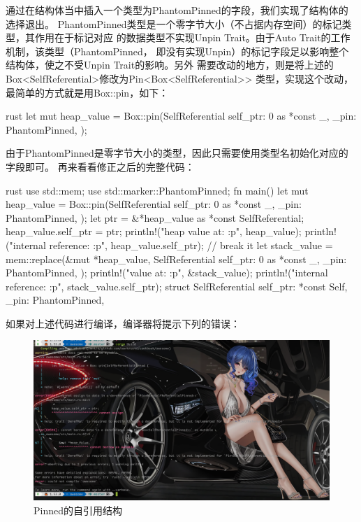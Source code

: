 通过在结构体当中插入一个类型为PhantomPinned的字段，我们实现了结构体的选择退出。
PhantomPinned类型是一个零字节大小（不占据内存空间）的标记类型，其作用在于标记对应
的数据类型不实现Unpin Trait。由于Auto Trait的工作机制，该类型（PhantomPinned，
即没有实现Unpin）的标记字段足以影响整个结构体，使之不受Unpin Trait的影响。另外
需要改动的地方，则是将上述的Box<SelfReferential>修改为Pin<Box<SelfReferential>>
类型，实现这个改动，最简单的方式就是用Box::pin，如下：
\begin{code-block}{rust}
let mut heap_value = Box::pin(SelfReferential {
    self_ptr: 0 as *const _,
    _pin: PhantomPinned,
});
\end{code-block}
由于PhantomPinned是零字节大小的类型，因此只需要使用类型名初始化对应的字段即可。
再来看看修正之后的完整代码：
\begin{code-block}{rust}
use std::mem;
use std::marker::PhantomPinned;
fn main() {
    let mut heap_value = Box::pin(SelfReferential {
        self_ptr: 0 as *const _, _pin: PhantomPinned,
    });
    let ptr = &*heap_value as *const SelfReferential;
    heap_value.self_ptr = ptr;
    println!("heap value at: {:p}", heap_value);
    println!("internal reference: {:p}", heap_value.self_ptr);
    // break it
    let stack_value = mem::replace(&mut *heap_value, SelfReferential {
        self_ptr: 0 as *const _, _pin: PhantomPinned,
    });
    println!("value at: {:p}", &stack_value);
    println!("internal reference: {:p}", stack_value.self_ptr);
}
struct SelfReferential {
    self_ptr: *const Self,
    _pin: PhantomPinned,
}
\end{code-block}
如果对上述代码进行编译，编译器将提示下列的错误：
\begin{figure}[H]
  \centering
  \includegraphics[width=\linewidth]{self_ref_pinned.png}
  \caption{Pinned的自引用结构}
  \label{fig:self_ref_pinned}
\end{figure}

